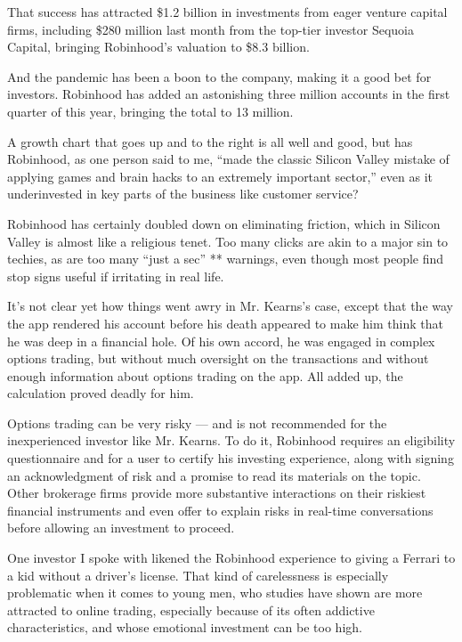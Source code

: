 That success has attracted \$1.2 billion in investments from eager
venture capital firms, including \$280 million last month from the
top-tier investor Sequoia Capital, bringing Robinhood's valuation to
\$8.3 billion.

And the pandemic has been a boon to the company, making it a good bet
for investors. Robinhood has added an astonishing three million accounts
in the first quarter of this year, bringing the total to 13 million.

A growth chart that goes up and to the right is all well and good, but
has Robinhood, as one person said to me, ``made the classic Silicon
Valley mistake of applying games and brain hacks to an extremely
important sector,'' even as it underinvested in key parts of the
business like customer service?

Robinhood has certainly doubled down on eliminating friction, which in
Silicon Valley is almost like a religious tenet. Too many clicks are
akin to a major sin to techies, as are too many ``just a sec'' **
warnings, even though most people find stop signs useful if irritating
in real life.

It's not clear yet how things went awry in Mr. Kearns's case, except
that the way the app rendered his account before his death appeared to
make him think that he was deep in a financial hole. Of his own accord,
he was engaged in complex options trading, but without much oversight on
the transactions and without enough information about options trading on
the app. All added up, the calculation proved deadly for him.

Options trading can be very risky --- and is not recommended for the
inexperienced investor like Mr. Kearns. To do it, Robinhood requires an
eligibility questionnaire and for a user to certify his investing
experience, along with signing an acknowledgment of risk and a promise
to read its materials on the topic. Other brokerage firms provide more
substantive interactions on their riskiest financial instruments and
even offer to explain risks in real-time conversations before allowing
an investment to proceed.

One investor I spoke with likened the Robinhood experience to giving a
Ferrari to a kid without a driver's license. That kind of carelessness
is especially problematic when it comes to young men, who studies have
shown are more attracted to online trading, especially because of its
often addictive characteristics, and whose emotional investment can be
too high.

